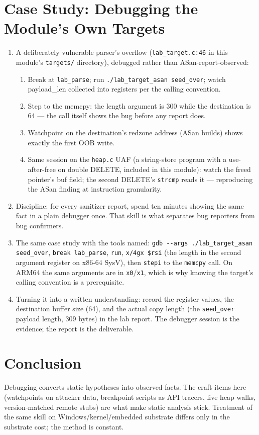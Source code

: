 \documentclass[12pt]{Training}
\begin{document}
\section*{Case Study: Debugging the Module's Own Targets}
\begin{enumerate}
    \item A deliberately vulnerable parser's overflow (\lstinline{lab_target.c:46} in this module's \lstinline{targets/} directory), debugged rather than ASan-report-observed:
    \begin{enumerate}
        \item Break at \lstinline{lab_parse}; run \lstinline{./lab_target_asan seed_over}; watch payload\_len collected into registers per the calling convention.
        \item Step to the memcpy: the length argument is 300 while the destination is 64 --- the call itself shows the bug before any report does.
        \item Watchpoint on the destination's redzone address (ASan builds) shows exactly the first OOB write.
        \item Same session on the \lstinline{heap.c} UAF (a string-store program with a use-after-free on double DELETE, included in this module): watch the freed pointer's buf field; the second DELETE's \lstinline{strcmp} reads it --- reproducing the ASan finding at instruction granularity.
    \end{enumerate}
    \item Discipline: for every sanitizer report, spend ten minutes showing the same fact in a plain debugger once. That skill is what separates bug reporters from bug confirmers.
    \item The same case study with the tools named: \lstinline{gdb --args ./lab_target_asan seed_over}, \lstinline{break lab_parse}, \lstinline{run}, \lstinline{x/4gx $rsi} (the length in the second argument register on x86-64 SysV), then \lstinline{stepi} to the \lstinline{memcpy} call. On ARM64 the same arguments are in \lstinline{x0}/\lstinline{x1}, which is why knowing the target's calling convention is a prerequisite.
    \item Turning it into a written understanding: record the register values, the destination buffer size (64), and the actual copy length (the \lstinline{seed_over} payload length, 309 bytes) in the lab report. The debugger session is the evidence; the report is the deliverable.
\end{enumerate}

\section*{Conclusion}
Debugging converts static hypotheses into observed facts. The craft items here (watchpoints on attacker data, breakpoint scripts as API tracers, live heap walks, version-matched remote stubs) are what make static analysis stick. Treatment of the same skill on Windows/kernel/embedded substrate differs only in the substrate cost; the method is constant.
\end{document}
